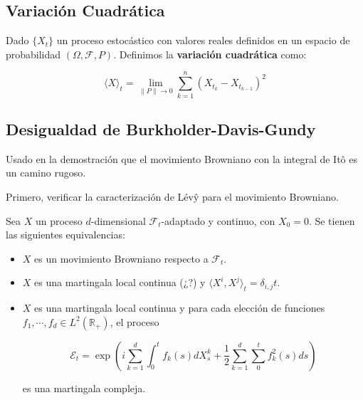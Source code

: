 \subsection{Variación Cuadrática}

\begin{boxDef}
	Dado $\{  X_t \}$ un proceso estocástico con valores reales definidos en un espacio de probabilidad $(\Omega, \mathcal{F}, P)$. Definimos la \textbf{variación cuadrática} como:

	\[
		\langle X \rangle_t = \lim_{ \lVert P \rVert \rightarrow 0 } \sum_{k = 1}^n (X_{t_k} - X_{t_{k-1}})^2	
	\]

\end{boxDef}







\subsection{Desigualdad de Burkholder-Davis-Gundy}

Usado en la demostración que el movimiento Browniano con la integral de Itô es un camino rugoso.



Primero, verificar la caracterización de Lévŷ para el movimiento Browniano.

\begin{theorem}[Lévy]
	Sea $X$ un proceso $d$-dimensional $\mathcal{F}_t$-adaptado y continuo, con $X_0 = 0$. Se tienen las siguientes equivalencias:

	\begin{itemize}

		\item $X$ es un movimiento Browniano respecto a $\mathcal{F}_t$.

		\item $X$ es una martingala local continua (¿?) y $\langle X^i, X^j \rangle_t = \delta_{i,j} t$.

		\item $X$ es una martingala local continua y para cada elección de funciones $f_1, \cdots, f_d \in L^2 (\mathbb{R}_+)$, el proceso

		\[
			\mathcal{E}_t = \exp \left( i \sum_{k = 1}^d \int_0^t f_k (s) dX^k_s + \frac{1}{2} \sum_{k=1}^d \sum_0^t f^2_k(s) ds \right)
		\]

		es una martingala compleja.
	
	\end{itemize}

\end{theorem}

